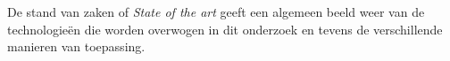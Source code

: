 \chapter{}
\label{ch:stand-van-zaken}






De stand van zaken of \textit{State of the art} geeft een algemeen beeld weer van de technologieën die worden overwogen in dit onderzoek en tevens de verschillende manieren van toepassing.


